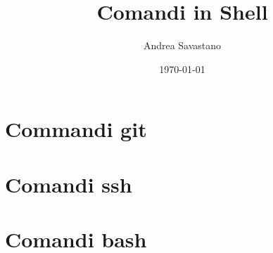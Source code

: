 \documentclass[12pt, a4paper]{article}
\title{Comandi in Shell}
\author{Andrea Savastano}
\date{\today}
\newcommand{\disablelinkcolor}{%
	\hypersetup{linkcolor=black}%
}
\begin{document}
	
	\fancyhf{} %
	\fancyhead[L]{\nouppercase{\leftmark}} %
	
	\maketitle
	\disablelinkcolor
	\tableofcontents
	\newpage
	
	\section{Commandi git}
	
	
	\newpage
	\section{Comandi ssh}
	
	
	\newpage
	\section{Comandi bash}
	
	
\end{document}
